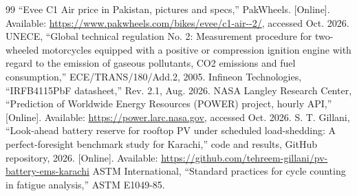 \documentclass[conference]{IEEEtran}
\begin{document}
\begin{thebibliography}{99}
 ``Evee C1 Air price in Pakistan, pictures and specs,'' PakWheels. [Online]. Available: \url{https://www.pakwheels.com/bikes/evee/c1-air--2/}, accessed Oct. 2026.
 UNECE, ``Global technical regulation No. 2: Measurement procedure for two-wheeled motorcycles equipped with a positive or compression ignition engine with regard to the emission of gaseous pollutants, CO2 emissions and fuel consumption,'' ECE/TRANS/180/Add.2, 2005.
 Infineon Technologies, ``IRFB4115PbF datasheet,'' Rev. 2.1, Aug. 2026.
 NASA Langley Research Center, ``Prediction of Worldwide Energy Resources (POWER) project, hourly API,'' [Online]. Available: \url{https://power.larc.nasa.gov}, accessed Oct. 2026.
 S. T. Gillani, ``Look-ahead battery reserve for rooftop PV under scheduled load-shedding: A perfect-foresight benchmark study for Karachi,'' code and results, GitHub repository, 2026. [Online]. Available: \url{https://github.com/tehreem-gillani/pv-battery-ems-karachi}
 ASTM International, ``Standard practices for cycle counting in fatigue analysis,'' ASTM E1049-85.
\end{thebibliography}
\end{document}
